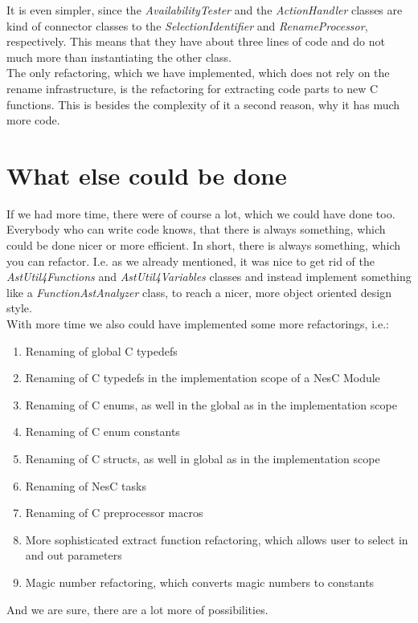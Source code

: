 \documentclass[a4paper,10pt]{report}
\begin{document}
It is even simpler, since the {\it AvailabilityTester} and the {\it ActionHandler} classes are kind of connector classes to the {\it SelectionIdentifier} and {\it RenameProcessor}, respectively. This means that they have about three lines of code and do not much more than instantiating the other class.\\
The only refactoring, which we have implemented, which does not rely on the rename infrastructure, is the refactoring for extracting code parts to new C functions. This is besides the complexity of it a second reason, why it has much more code.

\section{What else could be done}
If we had more time, there were of course a lot, which we could have done too. Everybody who can write code knows, that there is always something, which could be done nicer or more efficient. In short, there is always something, which you can refactor.
I.e. as we already mentioned, it was nice to get rid of the {\it AstUtil4Functions} and {\it AstUtil4Variables} classes and instead implement something like a {\it FunctionAstAnalyzer} class, to reach a nicer, more object oriented design style.\\
With more time we also could have implemented some more refactorings, i.e.:
    \begin{enumerate}
     \item Renaming of global C typedefs
     \item Renaming of C typedefs in the implementation scope of a NesC Module
     \item Renaming of C enums, as well in the global as in the implementation scope
     \item Renaming of C enum constants
     \item Renaming of C structs, as well in global as in the implementation scope
     \item Renaming of NesC tasks
     \item Renaming of C preprocessor macros
     \item More sophisticated extract function refactoring, which allows user to select in and out parameters
     \item Magic number refactoring, which converts magic numbers to constants
   \end{enumerate}
And we are sure, there are a lot more of possibilities.
\end{document}
